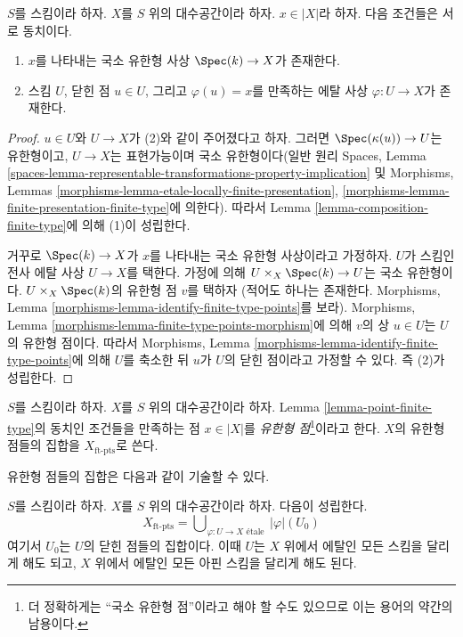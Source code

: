 \begin{lemma}
\label{lemma-point-finite-type}
$S$를 스킴이라 하자. $X$를 $S$ 위의 대수공간이라 하자.
$x \in |X|$라 하자. 다음 조건들은 서로 동치이다.
\begin{enumerate}
\item $x$를 나타내는 국소 유한형 사상 $\Spec(k) \to X$가 존재한다.
\item 스킴 $U$, 닫힌 점 $u \in U$, 그리고 $\varphi(u) = x$를
만족하는 에탈 사상 $\varphi : U \to X$가 존재한다.
\end{enumerate}
\end{lemma}

\begin{proof}
$u \in U$와 $U \to X$가 (2)와 같이 주어졌다고 하자.
그러면 $\Spec(\kappa(u)) \to U$는 유한형이고, $U \to X$는 표현가능이며
국소 유한형이다(일반 원리 Spaces, Lemma
\ref{spaces-lemma-representable-transformations-property-implication} 및
Morphisms, Lemmas \ref{morphisms-lemma-etale-locally-finite-presentation},
\ref{morphisms-lemma-finite-presentation-finite-type}에 의한다).
따라서 Lemma \ref{lemma-composition-finite-type}에 의해 (1)이 성립한다.

\medskip\noindent
거꾸로 $\Spec(k) \to X$가 $x$를 나타내는 국소 유한형 사상이라고
가정하자. $U$가 스킴인 전사 에탈 사상 $U \to X$를 택한다.
가정에 의해 $U \times_X \Spec(k) \to U$는 국소 유한형이다.
$U \times_X \Spec(k)$의 유한형 점 $v$를 택하자
(적어도 하나는 존재한다. Morphisms, Lemma
\ref{morphisms-lemma-identify-finite-type-points}를 보라).
Morphisms, Lemma \ref{morphisms-lemma-finite-type-points-morphism}에 의해
$v$의 상 $u \in U$는 $U$의 유한형 점이다. 따라서 Morphisms, Lemma
\ref{morphisms-lemma-identify-finite-type-points}에 의해 $U$를 축소한 뒤
$u$가 $U$의 닫힌 점이라고 가정할 수 있다. 즉 (2)가 성립한다.
\end{proof}

\begin{definition}
\label{definition-finite-type-point}
$S$를 스킴이라 하자. $X$를 $S$ 위의 대수공간이라 하자.
Lemma \ref{lemma-point-finite-type}의 동치인 조건들을 만족하는
점 $x \in |X|$를 {\it 유한형 점}\footnote{더 정확하게는
“국소 유한형 점”이라고 해야 할 수도 있으므로 이는 용어의 약간의
남용이다.}이라고 한다. $X$의 유한형 점들의 집합을
$X_{\text{ft-pts}}$로 쓴다.
\end{definition}

\noindent
유한형 점들의 집합은 다음과 같이 기술할 수 있다.

\begin{lemma}
\label{lemma-identify-finite-type-points}
$S$를 스킴이라 하자. $X$를 $S$ 위의 대수공간이라 하자. 다음이 성립한다.
$$
X_{\text{ft-pts}} =
\bigcup\nolimits_{\varphi : U \to X\text{ \'etale }} |\varphi|(U_0)
$$
여기서 $U_0$는 $U$의 닫힌 점들의 집합이다.
이때 $U$는 $X$ 위에서 에탈인 모든 스킴을 달리게 해도 되고,
$X$ 위에서 에탈인 모든 아핀 스킴을 달리게 해도 된다.
\end{lemma}

